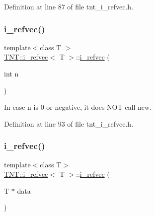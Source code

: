 Definition at line 87 of file tnt\+\_\+i\+\_\+refvec.\+h.

\mbox{\label{classTNT_1_1i__refvec_af331cca09a3d6ec6ba51cff9fd4a3c1f}} 
\subsubsection{\texorpdfstring{i\+\_\+refvec()}{i\_refvec()}\hspace{0.1cm}{\footnotesize\ttfamily [2/4]}}
{\footnotesize\ttfamily template$<$class T $>$ \\
\hyperlink{classTNT_1_1i__refvec}{T\+N\+T\+::i\+\_\+refvec}$<$ T $>$\+::\hyperlink{classTNT_1_1i__refvec}{i\+\_\+refvec} (\begin{DoxyParamCaption}\item[{int}]{n }\end{DoxyParamCaption})\hspace{0.3cm}{\ttfamily [explicit]}}



In case n is 0 or negative, it does N\+OT call new. 



Definition at line 93 of file tnt\+\_\+i\+\_\+refvec.\+h.

\mbox{\label{classTNT_1_1i__refvec_a53d5023955c537c1c2e112506c89714f}} 
\subsubsection{\texorpdfstring{i\+\_\+refvec()}{i\_refvec()}\hspace{0.1cm}{\footnotesize\ttfamily [3/4]}}
{\footnotesize\ttfamily template$<$class T$>$ \\
\hyperlink{classTNT_1_1i__refvec}{T\+N\+T\+::i\+\_\+refvec}$<$ T $>$\+::\hyperlink{classTNT_1_1i__refvec}{i\+\_\+refvec} (\begin{DoxyParamCaption}\item[{T $\ast$}]{data }\end{DoxyParamCaption})\hspace{0.3cm}{\ttfamily [inline]}}



